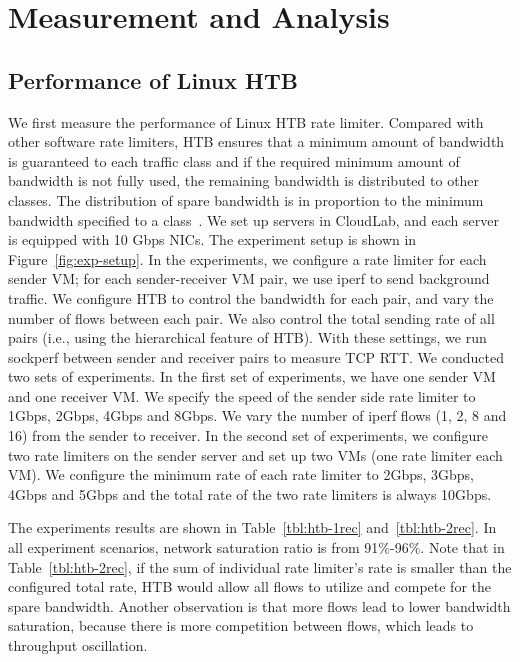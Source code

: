 \section{Measurement and Analysis}
\label{rate-limiter:sec:measurement}

\subsection{Performance of Linux HTB}


We first measure the performance of Linux HTB rate limiter. 
Compared with other software rate limiters, HTB ensures that a minimum amount of bandwidth is guaranteed 
to each traffic class and
if the required minimum amount of bandwidth is not fully used, the remaining bandwidth is distributed to other classes.
The distribution of spare bandwidth is in proportion to the minimum bandwidth specified to a class~\cite{linux-htb-intro}.
We set up servers in CloudLab, and each server is equipped with 10 Gbps NICs. 
The experiment setup is shown in Figure~\ref{fig:exp-setup}.
In the experiments, we configure a rate limiter for each sender VM; 
for each sender-receiver VM pair, we use iperf to send background traffic. 
We configure HTB to control the bandwidth for each pair, and vary the number of flows between each pair.
We also control the total sending rate of all pairs (i.e., using the hierarchical feature of HTB).
With these settings, we run sockperf between sender and receiver pairs to measure TCP RTT. 
We conducted two sets of experiments. In the first set of experiments, 
we have one sender VM and one receiver VM.
We specify the speed of the sender side rate limiter to 1Gbps, 2Gbps, 4Gbps and 8Gbps. 
We vary the number of iperf flows (1, 2, 8 and 16) from
the sender to receiver. In the second set of experiments, 
we configure two rate limiters on the sender server and set up two VMs (one rate limiter each VM).
We configure the minimum rate of each rate limiter to 2Gbps, 3Gbps, 4Gbps and 5Gbps and
the total rate of the two rate limiters is always 10Gbps. 




The experiments results are shown in Table~\ref{tbl:htb-1rec} and~\ref{tbl:htb-2rec}. 
In all experiment scenarios, network saturation ratio is from 91\%-96\%. 
Note that in Table~\ref{tbl:htb-2rec}, if the sum of individual rate limiter's rate is smaller than the configured total rate, 
HTB would allow all flows to utilize and compete for the spare bandwidth. 
Another observation is that more flows lead to lower bandwidth saturation, 
because there is more competition between flows, which leads to throughput oscillation.

